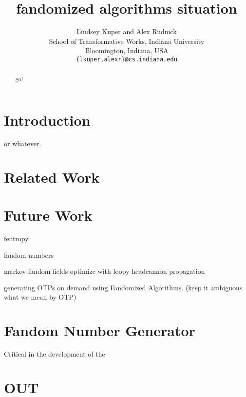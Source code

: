 \documentclass[11pt,twocolumn]{article}
\title{fandomized algorithms situation}
\author{Lindsey Kuper and Alex Rudnick \\
  School of Transformative Works, Indiana University \\
  Bloomington, Indiana, USA\\
  {\tt \{lkuper,alexr\}@cs.indiana.edu} }
\date{}
\begin{document}
\maketitle

\begin{abstract}
go!
\end{abstract}

\section{Introduction}
\cite{DBLP:books/daglib/0067131} or whatever.

\section{Related Work}


\section{Future Work}
fentropy

fandom numbers

markov fandom fields
optimize with loopy headcannon propagation

generating OTPs on demand using Fandomized Algorithms. (keep it ambiguous what
we mean by OTP)

\section{Fandom Number Generator}
Critical in the development of the 

\section{OUT}


{}
\end{document}
